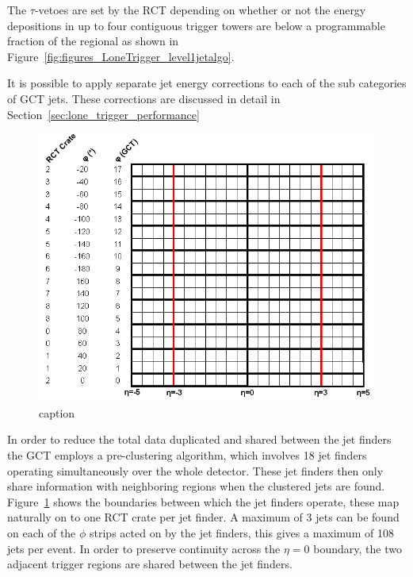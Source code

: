 The $\tau$-vetoes are set by the RCT depending on whether or not the energy 
depositions in up to four contiguous trigger towers are below a programmable 
fraction of the regional \ET as shown in 
Figure~\ref{fig:figures_LoneTrigger_level1jetalgo}.

It is possible to apply separate jet energy corrections to each of the sub 
categories of GCT jets. These corrections are discussed in detail in 
Section~\ref{sec:lone_trigger_performance}

\begin{figure}[ht]
  \centering    
  \includegraphics[width=\textwidth]{figures/LoneTrigger/jetfindermappings.png}
  \caption{caption}
  \label{fig:figures_LoneTrigger_jetfindermappings}
\end{figure}

In order to reduce the total data duplicated and shared between the jet finders
the GCT employs a pre-clustering algorithm, which involves 18 jet finders 
operating simultaneously over the whole detector. These jet finders then only
share information with neighboring regions when the clustered jets are found.
Figure~\ref{fig:figures_LoneTrigger_jetfindermappings} shows the boundaries 
between which the jet finders operate, these map naturally on to one RCT crate 
per jet finder. A maximum of 3 jets can be found on each of the $\phi$ strips
acted on by the jet finders, this gives a maximum of 108 jets per event. In
order to preserve continuity across the $\eta = 0$ boundary, the two adjacent
trigger regions are shared between the jet finders.


